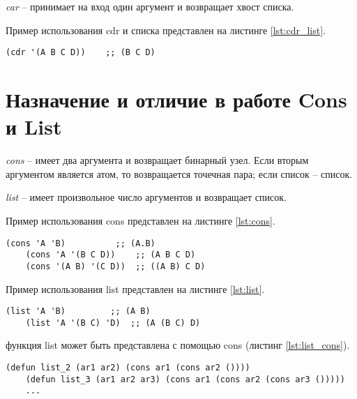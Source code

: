 \textit{car} -- принимает на вход один аргумент и возвращает хвост списка.

Пример использования cdr и списка представлен на листинге \ref{lst:cdr_list}. 

\begin{lstlisting}[label=lst:cdr_list, caption=Использование cdr и списка.]
	(cdr '(A B C D))    ;; (B C D)
\end{lstlisting}

\section{Назначение и отличие в работе Cons и List}
\textit{cons} -- имеет два аргумента и возвращает бинарный узел. Если вторым аргументом является атом, то возвращается точечная пара; если список -- список.

\textit{list} -- имеет произвольное число аргументов и возвращает список.

Пример использования cons представлен на листинге \ref{lst:cons}.
\begin{lstlisting}[label=lst:cons, caption=Использование cons.]
	(cons 'A 'B)          ;; (A.B)
	(cons 'A '(B C D))    ;; (A B C D)
	(cons '(A B) '(C D))  ;; ((A B) C D) 
\end{lstlisting}

Пример использования list представлен на листинге \ref{lst:list}.
\begin{lstlisting}[label=lst:list, caption=Использование list.]
	(list 'A 'B)         ;; (A B)
	(list 'A '(B C) 'D)  ;; (A (B C) D)
\end{lstlisting}

функция list может быть представлена с помощью cons (листинг \ref{lst:list_cons}).

\begin{lstlisting}[label=lst:list_cons, caption=Представление list с помощью cons.]
	(defun list_2 (ar1 ar2) (cons ar1 (cons ar2 ())))
	(defun list_3 (ar1 ar2 ar3) (cons ar1 (cons ar2 (cons ar3 ()))))
	...
\end{lstlisting}

